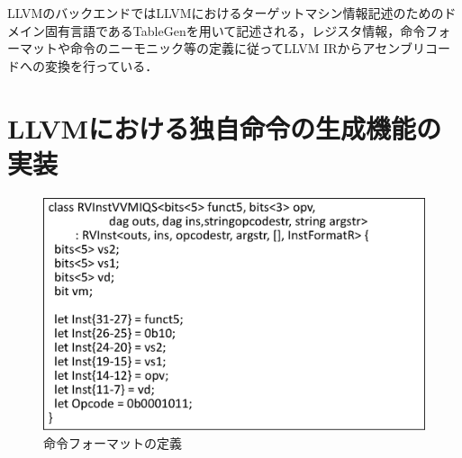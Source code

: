﻿\documentclass[a4j]{jarticle}
\begin{document}



LLVMのバックエンドではLLVMにおけるターゲットマシン情報記述のためのドメイン固有言語であるTableGenを用いて記述される，レジスタ情報，命令フォーマットや命令のニーモニック等の定義に従ってLLVM IRからアセンブリコードへの変換を行っている．



\section{LLVMにおける独自命令の生成機能の実装}

\begin{figure}[t]
    \centering
    \includegraphics[scale=0.35]{RVInstVVMIQS.eps}
    \caption{命令フォーマットの定義}
    \label{fig:Instruciton_format}
\end{figure}
\end{document}
